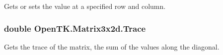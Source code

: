 Gets or sets the value at a specified row and column. 

\hypertarget{struct_open_t_k_1_1_matrix3x2d_a3a88c62273705c9560551c07b2f670c7}{
\subsubsection[{Trace}]{\setlength{\rightskip}{0pt plus 5cm}double Open\-T\-K.\-Matrix3x2d.\-Trace\hspace{0.3cm}{\ttfamily [get]}}}\label{struct_open_t_k_1_1_matrix3x2d_a3a88c62273705c9560551c07b2f670c7}


Gets the trace of the matrix, the sum of the values along the diagonal. 


